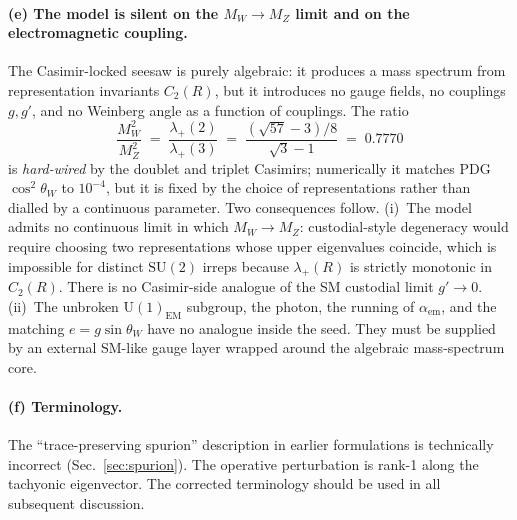 \documentclass[%
 aps,
 prd,
 reprint,
 nofootinbib,
 superscriptaddress,
 amsmath,
 amssymb,
]{revtex4-2}
\begin{document}
\paragraph{(e) The model is silent on the $M_W\to M_Z$ limit and on the electromagnetic coupling.} The Casimir-locked seesaw is purely algebraic: it produces a mass spectrum from representation invariants $C_2(R)$, but it introduces no gauge fields, no couplings $g,g'$, and no Weinberg angle as a function of couplings. The ratio
\begin{equation}\label{eq:cosw}
\frac{M_W^2}{M_Z^2}\;=\;\frac{\lambda_+(2)}{\lambda_+(3)}\;=\;\frac{(\sqrt{57}-3)/8}{\sqrt{3}-1}\;=\;0.7770
\end{equation}
is \emph{hard-wired} by the doublet and triplet Casimirs; numerically it matches PDG $\cos^2\theta_W$ to $10^{-4}$, but it is fixed by the choice of representations rather than dialled by a continuous parameter. Two consequences follow. (i)~The model admits no continuous limit in which $M_W\to M_Z$: custodial-style degeneracy would require choosing two representations whose upper eigenvalues coincide, which is impossible for distinct $\mathrm{SU}(2)$ irreps because $\lambda_+(R)$ is strictly monotonic in $C_2(R)$. There is no Casimir-side analogue of the SM custodial limit $g'\to 0$. (ii)~The unbroken $\mathrm{U}(1)_{\mathrm{EM}}$ subgroup, the photon, the running of $\alpha_{\mathrm{em}}$, and the matching $e=g\sin\theta_W$ have no analogue inside the seed. They must be supplied by an external SM-like gauge layer wrapped around the algebraic mass-spectrum core.

\paragraph{(f) Terminology.} The ``trace-preserving spurion'' description in earlier formulations is technically incorrect (Sec.~\ref{sec:spurion}). The operative perturbation is rank-1 along the tachyonic eigenvector. The corrected terminology should be used in all subsequent discussion.
\end{document}
